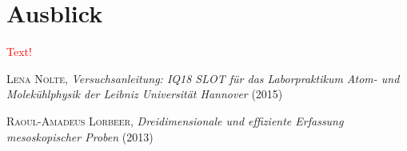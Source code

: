 \section{Ausblick}
\textcolor{red}{Text!}

\clearpage
\listoffigures
\begin{thebibliography}{99}
 \textsc{Lena Nolte}, \emph{Versuchsanleitung: IQ18 SLOT für das Laborpraktikum Atom- und Molekühlphysik
der Leibniz Universität Hannover} (2015) 

 \textsc{Raoul-Amadeus Lorbeer}, \emph{Dreidimensionale und effiziente Erfassung mesoskopischer Proben} (2013) 
\end{thebibliography}




